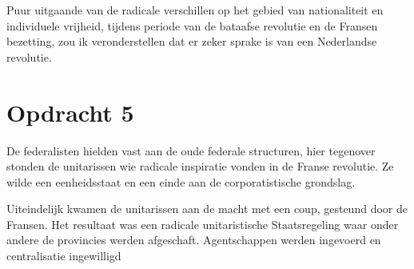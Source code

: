 \documentclass[11pt]{amsart}
\begin{document}
Puur uitgaande van de radicale verschillen op het gebied van nationaliteit en individuele vrijheid, tijdens periode van de bataafse revolutie en de Fransen bezetting, zou ik veronderstellen dat er zeker sprake is van een Nederlandse revolutie.

\section*{Opdracht 5}
De federalisten hielden vast aan de oude federale structuren, hier tegenover stonden de unitarissen wie radicale inspiratie vonden in de Franse revolutie.\autocite[200]{wielengaGeschiedenisVanNederland2022} Ze wilde een eenheidsstaat en een einde aan de corporatistische grondslag.\autocite[199]{wielengaGeschiedenisVanNederland2022}

Uiteindelijk kwamen de unitarissen aan de macht met een coup, gesteund door de Fransen.\autocite[200]{wielengaGeschiedenisVanNederland2022} Het resultaat was een radicale unitaristische Staatsregeling waar onder andere de provincies werden afgeschaft.\autocite[200]{wielengaGeschiedenisVanNederland2022} Agentschappen werden ingevoerd en centralisatie ingewilligd \autocite[200]{wielengaGeschiedenisVanNederland2022}





\printbibliography{}
\end{document}
